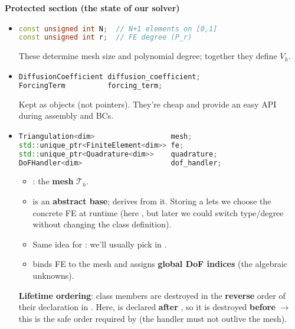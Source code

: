 \highspace
\begin{flushleft}
    \textcolor{Green3}{ \textbf{Protected section (the state of our solver)}}
\end{flushleft}
\begin{itemize}
    \item {}
    \begin{lstlisting}[language=C++]
const unsigned int N;  // N+1 elements on [0,1]
const unsigned int r;  // FE degree (P_r)
    \end{lstlisting}
    These determine mesh size and polynomial degree; together they define $V_h$.


    \item {}
    \begin{lstlisting}[language=C++]
DiffusionCoefficient diffusion_coefficient;
ForcingTerm          forcing_term;\end{lstlisting}
    Kept as objects (not pointers). They're cheap and provide an easy API during assembly and BCs.


    \item {}
    \begin{lstlisting}[language=C++]
Triangulation<dim>                  mesh;
std::unique_ptr<FiniteElement<dim>> fe;
std::unique_ptr<Quadrature<dim>>    quadrature;
DoFHandler<dim>                     dof_handler;\end{lstlisting}
    \begin{itemize}
        \item {}: the \textbf{mesh} $\mathcal{T}_h$.
        \item {} is an \textbf{abstract base};  derives from it. Storing a  lets we choose the concrete FE at runtime (here , but later we could switch type/degree without changing the class definition).
        \item Same idea for : we'll usually pick  in .
        \item {} binds FE to the mesh and assigns \textbf{global DoF indices} (the algebraic unknowns).
    \end{itemize}
    \textbf{Lifetime ordering}: class members are destroyed in the \textbf{reverse} order of their declaration in . Here,  is declared \textbf{after} , so it is destroyed \textbf{before}  $\rightarrow$ this is the safe order required by  (the handler must not outlive the mesh).



\end{itemize}
